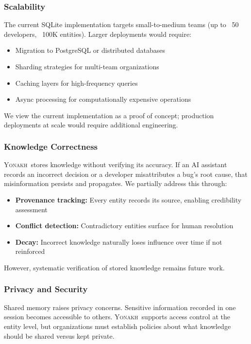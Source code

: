 \documentclass[10pt,journal,compsoc]{IEEEtran}
\newcommand{\yonakh}{\textsc{Yonakh}}
\begin{document}
\subsubsection{Scalability}

The current SQLite implementation targets small-to-medium teams (up to ~50 developers, ~100K entities). Larger deployments would require:

\begin{itemize}
\item Migration to PostgreSQL or distributed databases
\item Sharding strategies for multi-team organizations  
\item Caching layers for high-frequency queries
\item Async processing for computationally expensive operations
\end{itemize}

We view the current implementation as a proof of concept; production deployments at scale would require additional engineering.

\subsubsection{Knowledge Correctness}

\yonakh\ stores knowledge without verifying its accuracy. If an AI assistant records an incorrect decision or a developer misattributes a bug's root cause, that misinformation persists and propagates. We partially address this through:

\begin{itemize}
\item \textbf{Provenance tracking:} Every entity records its source, enabling credibility assessment
\item \textbf{Conflict detection:} Contradictory entities surface for human resolution
\item \textbf{Decay:} Incorrect knowledge naturally loses influence over time if not reinforced
\end{itemize}

However, systematic verification of stored knowledge remains future work.

\subsubsection{Privacy and Security}

Shared memory raises privacy concerns. Sensitive information recorded in one session becomes accessible to others. \yonakh\ supports access control at the entity level, but organizations must establish policies about what knowledge should be shared versus kept private.
\end{document}
